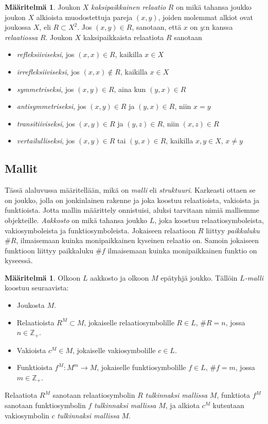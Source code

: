 \documentclass[finnish]{tktltiki2}
\theoremstyle{definition}
\newtheorem{maar}[lau]{Määritelmä}
\theoremstyle{remark}
\begin{document}
\begin{maar}
Joukon $X$ \textit{kaksipaikkainen relaatio} $R$ on mikä tahansa joukko joukon $X$ alkioista muodostettuja pareja $(x, y)$, joiden molemmat alkiot ovat joukossa $X$, eli $R \subset X^2$.  Jos $(x, y) \in R$, sanotaan, että $x$ on $y$:n kanssa \textit{relaatiossa} $R$. Joukon $X$ kaksipaikkaista relaatiota $R$ sanotaan
\begin{itemize}
\item \textit{refleksiiviseksi}, jos $(x, x) \in R$, kaikilla $x \in X$
\item \textit{irrefleksiiviseksi}, jos $(x, x) \notin R$, kaikilla $x \in X$
\item \textit{symmetriseksi}, jos $(x, y) \in R$, aina kun $(y, x) \in R$
\item \textit{antisymmetriseksi}, jos $(x, y) \in R$ ja $(y, x) \in R$, niin $x = y$
\item \textit{transitiiviseksi}, jos $(x, y) \in R$ ja $(y, z) \in R$, niin $(x, z) \in R$
\item \textit{vertailulliseksi}, jos $(x, y) \in R$ tai $(y, x) \in R$, kaikilla $x, y \in X$, $x \neq y$
\end{itemize}
\end{maar}

\subsection{Mallit}
Tässä alaluvussa määritellään, mikä on \textit{malli} eli \textit{struktuuri}. Karkeasti ottaen se on joukko, jolla on jonkinlainen rakenne ja joka koostuu relaatioista, vakioista ja funktioista. Jotta mallin määrittely onnistuisi, aluksi tarvitaan nimiä malliemme objekteille. \textit{Aakkosto} on mikä tahansa joukko $L$, joka koostuu relaatiosymboleista, vakiosymboleista ja funktiosymboleista. Jokaiseen relaatioon $R$ liittyy \textit{paikkaluku} $\#R$, ilmaisemaan kuinka monipaikkainen kyseinen relaatio on. Samoin jokaiseen funktioon liittyy paikkaluku $\#f$ ilmaisemaan kuinka monipaikkainen funktio on kyseessä.

\begin{maar} Olkoon $L$ aakkosto ja olkoon $M$ epätyhjä joukko. Tällöin $L$\textit{-malli} koostuu seuraavista:
\begin{itemize}
\item Joukosta $M$.
\item Relaatioista $R^M \subset M$, jokaiselle relaatiosymbolille $R \in L$, $\#R = n$, jossa $n\in \mathbb{Z}_+$.
\item Vakioista $c^M \in M$, jokaiselle vakiosymbolille $c \in L$.
\item Funktioista $f^M: M^m \rightarrow M$, jokaiselle funktiosymbolille $f \in L$, $\#f = m$, jossa $m\in \mathbb{Z}_+$.
\end{itemize}

Relaatiota $R^M$ sanotaan relaatiosymbolin $R$ \textit{tulkinnaksi mallissa} $M$, funktiota $f^M$ sanotaan funktiosymbolin $f$ \textit{tulkinnaksi mallissa} $M$, ja alkiota $c^M$ kutsutaan vakiosymbolin $c$ \textit{tulkinnaksi mallissa} $M$.
\end{maar}
\end{document}
